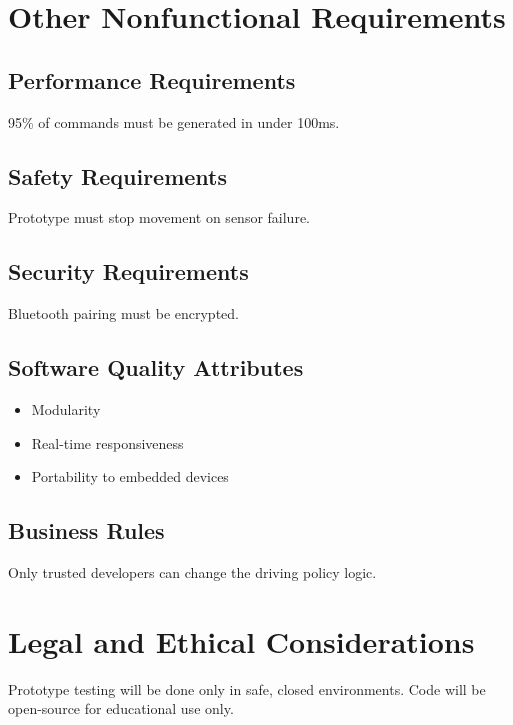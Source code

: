 \documentclass[12pt]{article}
\begin{document}
\section{Other Nonfunctional Requirements}
\subsection{Performance Requirements}
95\% of commands must be generated in under 100ms.

\subsection{Safety Requirements}
Prototype must stop movement on sensor failure.

\subsection{Security Requirements}
Bluetooth pairing must be encrypted.

\subsection{Software Quality Attributes}
\begin{itemize}[noitemsep]
  \item Modularity
  \item Real-time responsiveness
  \item Portability to embedded devices
\end{itemize}

\subsection{Business Rules}
Only trusted developers can change the driving policy logic.

\section{Legal and Ethical Considerations}
Prototype testing will be done only in safe, closed environments. Code will be open-source for educational use only.
\end{document}
